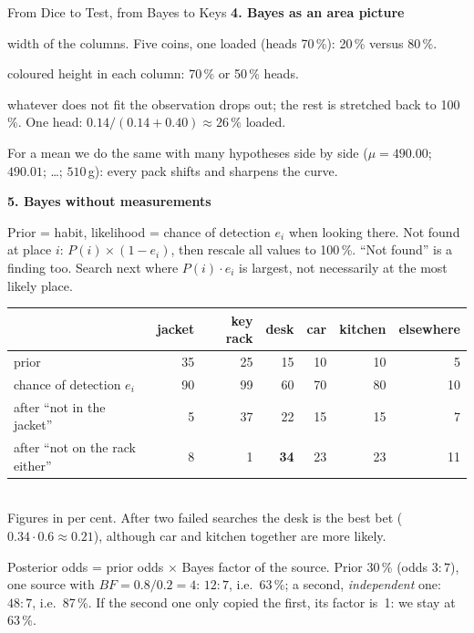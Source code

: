 \begin{handout}{From Dice to Test, from Bayes to Keys}
\textbf{4. Bayes as an area picture}
\begin{description}\itemsep 0pt
  \item[Prior] width of the columns. Five coins, one loaded (heads
    70\,\%): 20\,\% versus 80\,\%.
  \item[Likelihood] coloured height in each column: 70\,\% or 50\,\%
    heads.
  \item[Posterior] whatever does not fit the observation drops out; the
    rest is stretched back to 100\,\%. One head:
    $0.14/(0.14+0.40)\approx26\,\%$ loaded.
\end{description}
For a mean we do the same with many hypotheses side by side
($\mu=490.00$; $490.01$; \dots; $510$\,g): every pack shifts and sharpens
the curve.

\newpage
\textbf{5. Bayes without measurements}
\begin{description}\itemsep 0pt
  \item[Where are my keys?] Prior = habit, likelihood = chance of
    detection $e_i$ when looking there. Not found at place $i$:
    $P(i)\times(1-e_i)$, then rescale all values to 100\,\%.
    \enquote{Not found} is a finding too. Search next where
    $P(i)\cdot e_i$ is largest, not necessarily at the most likely place.
\end{description}
\begin{center}
\small
\begin{tabular}{@{}lrrrrrr@{}}
\toprule
 & jacket & key rack & desk & car & kitchen & elsewhere \\
\midrule
prior & 35 & 25 & 15 & 10 & 10 & 5 \\
chance of detection $e_i$ & 90 & 99 & 60 & 70 & 80 & 10 \\
after \enquote{not in the jacket} & 5 & 37 & 22 & 15 & 15 & 7 \\
after \enquote{not on the rack either} & 8 & 1 & \textbf{34} & 23 & 23 & 11 \\
\bottomrule
\end{tabular}\\[0.5ex]
{\footnotesize Figures in per cent. After two failed searches the desk
is the best bet ($0.34\cdot0.6\approx0.21$), although car and kitchen
together are more likely.}
\end{center}
\begin{description}\itemsep 0pt
  \item[Do I believe this source?] Posterior odds = prior odds $\times$
    Bayes factor of the source. Prior 30\,\% (odds $3:7$), one source with
    $\mathit{BF}=0.8/0.2=4$: $12:7$, i.e.\ 63\,\%; a second,
    \emph{independent} one: $48:7$, i.e.\ 87\,\%. If the second one only
    copied the first, its factor is~1: we stay at 63\,\%.
\end{description}


\end{handout}
